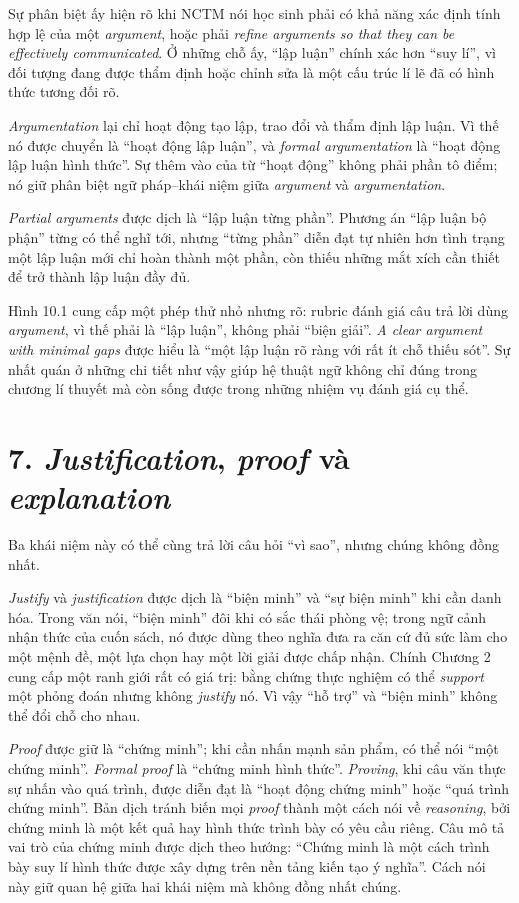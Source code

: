 Sự phân biệt ấy hiện rõ khi NCTM nói học sinh phải có khả năng xác định tính hợp lệ của một \emph{argument}, hoặc phải \emph{refine arguments so that they can be effectively communicated}. Ở những chỗ ấy, ``lập luận'' chính xác hơn ``suy lí'', vì đối tượng đang được thẩm định hoặc chỉnh sửa là một cấu trúc lí lẽ đã có hình thức tương đối rõ.

\emph{Argumentation} lại chỉ hoạt động tạo lập, trao đổi và thẩm định lập luận. Vì thế nó được chuyển là ``hoạt động lập luận'', và \emph{formal argumentation} là ``hoạt động lập luận hình thức''. Sự thêm vào của từ ``hoạt động'' không phải phần tô điểm; nó giữ phân biệt ngữ pháp--khái niệm giữa \emph{argument} và \emph{argumentation}.

\emph{Partial arguments} được dịch là ``lập luận từng phần''. Phương án ``lập luận bộ phận'' từng có thể nghĩ tới, nhưng ``từng phần'' diễn đạt tự nhiên hơn tình trạng một lập luận mới chỉ hoàn thành một phần, còn thiếu những mắt xích cần thiết để trở thành lập luận đầy đủ.

Hình 10.1 cung cấp một phép thử nhỏ nhưng rõ: rubric đánh giá câu trả lời dùng \emph{argument}, vì thế phải là ``lập luận'', không phải ``biện giải''. \emph{A clear argument with minimal gaps} được hiểu là ``một lập luận rõ ràng với rất ít chỗ thiếu sót''. Sự nhất quán ở những chi tiết như vậy giúp hệ thuật ngữ không chỉ đúng trong chương lí thuyết mà còn sống được trong những nhiệm vụ đánh giá cụ thể.

\section*{7. \emph{Justification}, \emph{proof} và \emph{explanation}}

Ba khái niệm này có thể cùng trả lời câu hỏi ``vì sao'', nhưng chúng không
đồng nhất.

\emph{Justify} và \emph{justification} được dịch là ``biện minh'' và ``sự biện minh'' khi cần danh hóa. Trong văn nói, ``biện minh'' đôi khi có sắc thái phòng vệ; trong ngữ cảnh nhận thức của cuốn sách, nó được dùng theo nghĩa đưa ra căn cứ đủ sức làm cho một mệnh đề, một lựa chọn hay một lời giải được chấp nhận. Chính Chương 2 cung cấp một ranh giới rất có giá trị: bằng chứng thực nghiệm có thể \emph{support} một phỏng đoán nhưng không \emph{justify} nó. Vì vậy ``hỗ trợ'' và ``biện minh'' không thể đổi chỗ cho nhau.

\emph{Proof} được giữ là ``chứng minh''; khi cần nhấn mạnh sản phẩm, có thể nói ``một chứng minh''. \emph{Formal proof} là ``chứng minh hình thức''. \emph{Proving}, khi câu văn thực sự nhấn vào quá trình, được diễn đạt là ``hoạt động chứng minh'' hoặc ``quá trình chứng minh''. Bản dịch tránh biến mọi \emph{proof} thành một cách nói về \emph{reasoning}, bởi chứng minh là một kết quả hay hình thức trình bày có yêu cầu riêng. Câu mô tả vai trò của chứng minh được dịch theo hướng: ``Chứng minh là một cách trình bày suy lí hình thức được xây dựng trên nền tảng kiến tạo ý nghĩa''. Cách nói này giữ quan hệ giữa hai khái niệm mà không đồng nhất chúng.

